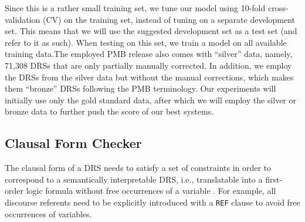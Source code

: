 \documentclass[11pt,a4paper]{article}
\begin{document}
\begin{table}[t]
\centering 
{}
\caption[]{Counts of relevant semantic phenomena for PMB release 2.1.0.\footnotemark{}
These phenomena are described and further discussed in Section\,\ref{sec:manual}.}
\label{pmb:semstats}
\end{table}


Since this is a rather small training set, we tune our model using 10-fold cross-validation (CV) on the training set, instead of tuning on a separate development set. This means that we will use the suggested development set as a test set (and refer to it as such). When testing on this set, we train a model on all available training data.The employed PMB release also comes with ``silver'' data, namely, 71,308 DRSs that are only partially manually corrected. 
In addition, we employ the DRSs from the silver data but without the manual corrections, which makes them ``bronze'' DRSs following the PMB terminology. Our experiments will initially use only the gold standard data, after which we will employ the silver or bronze data to further push the score of our best systems.

\subsection{Clausal Form Checker}
\label{ssec:clf_checker}

The clausal form of a DRS needs to satisfy a set of constraints in order to correspond to a semantically interpretable DRS, i.e., translatable into a first-order logic formula without free occurrences of a variable \cite{kampreyle:drt}.
For example, all discourse referents need to be explicitly introduced with a \texttt{REF} clause to avoid free occurrences of variables.
\end{document}
